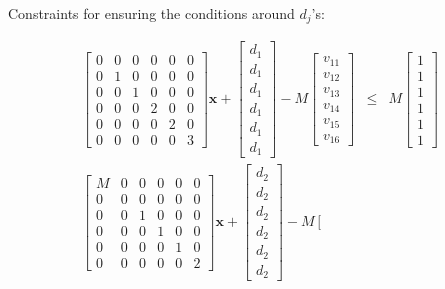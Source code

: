 \documentclass[authoryear,preprint,review,12pt]{elsarticle}
\begin{document}
Constraints for ensuring the conditions around $d_{j}$'s:

\begin{eqnarray*}
\left[\begin{array}{cccccc}
0 & 0 & 0 & 0 & 0 & 0\\
0 & 1 & 0 & 0 & 0 & 0\\
0 & 0 & 1 & 0 & 0 & 0\\
0 & 0 & 0 & 2 & 0 & 0\\
0 & 0 & 0 & 0 & 2 & 0\\
0 & 0 & 0 & 0 & 0 & 3
\end{array}\right]\mathbf{x}+\left[\begin{array}{c}
d_{1}\\
d_{1}\\
d_{1}\\
d_{1}\\
d_{1}\\
d_{1}
\end{array}\right]-M\left[\begin{array}{c}
v_{11}\\
v_{12}\\
v_{13}\\
v_{14}\\
v_{15}\\
v_{16}
\end{array}\right] & \leq & M\left[\begin{array}{c}
1\\
1\\
1\\
1\\
1\\
1
\end{array}\right]\\
\left[\begin{array}{cccccc}
M & 0 & 0 & 0 & 0 & 0\\
0 & 0 & 0 & 0 & 0 & 0\\
0 & 0 & 1 & 0 & 0 & 0\\
0 & 0 & 0 & 1 & 0 & 0\\
0 & 0 & 0 & 0 & 1 & 0\\
0 & 0 & 0 & 0 & 0 & 2
\end{array}\right]\mathbf{x}+\left[\begin{array}{c}
d_{2}\\
d_{2}\\
d_{2}\\
d_{2}\\
d_{2}\\
d_{2}
\end{array}\right]-M\left[\begin{array}{c}

\end{array}
\end{eqnarray*}
\end{document}
